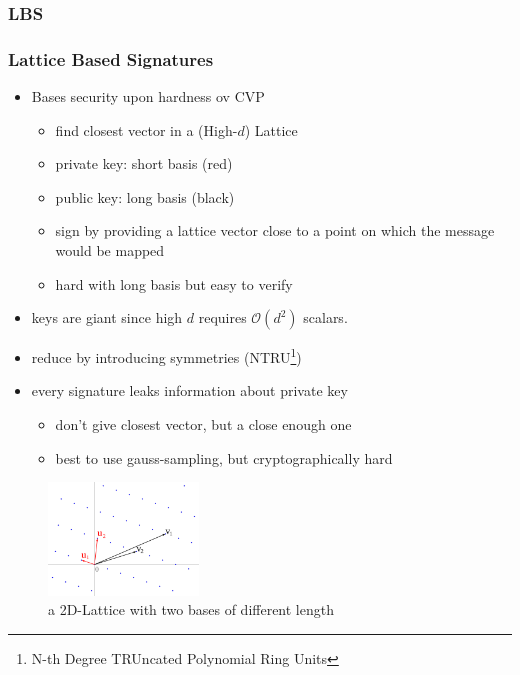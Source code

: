\documentclass[ucs,10pt]{beamer}
\begin{document}
\subsubsection{LBS}
\begin{frame}
  \frametitle{Lattice Based Signatures}

  \begin{itemize}
    \item Bases security upon hardness ov CVP
    \begin{itemize}
      \item find closest vector in a (High-$d$) Lattice
      \item private key: short basis (red)
      \item public key: long basis (black)
      \item sign by providing a lattice vector close to a point on which the message would be mapped
      \item hard with long basis but easy to verify
    \end{itemize}
    \item keys are giant since high $d$ requires $\mathcal{O}(d^2)$ scalars.
    \item reduce by introducing symmetries (NTRU\footnote{N-th Degree TRUncated Polynomial Ring Units })
    \item every signature leaks information about private key
    \begin{itemize}
      \item don't give closest vector, but a close enough one
      \item best to use gauss-sampling, but cryptographically hard
    \end{itemize}
    
  \end{itemize}
  \begin{figure}[]
    \centering
    \includegraphics[height=3cm]{../graphics/1200px-Lattice-reduction.png}
    \caption{a 2D-Lattice with two bases of different length \cite{img:lattice_bases}}
    \label{lattice}
  \end{figure}

\end{frame}
\end{document}
